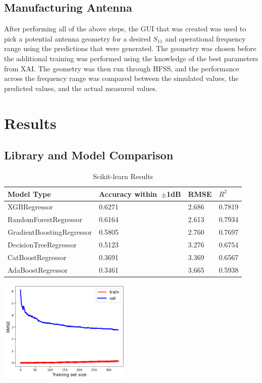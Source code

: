 \documentclass[conference]{IEEEtran}
\newenvironment{Figure}
    {\par\medskip\noindent\minipage{\linewidth}}
    {\endminipage\par\medskip}
\begin{document}
\subsection{Manufacturing Antenna}
After performing all of the above steps, the GUI that was created was used to pick a potential antenna geometry for a desired $S_{11}$ and operational frequency range using the predictions that were generated. The geometry was chosen before the additional training was performed using the knowledge of the best parameters from XAI. The geometry was then run through HFSS, and the performance across the frequency range was compared between the simulated values, the predicted values, and the actual measured values. 


\section{Results}
\subsection{Library and Model Comparison}

\begin{table}[h]
\caption{Scikit-learn Results}
\begin{center}
\begin{tabular}{ |l|l|l|l| }
    \hline
    Model Type & Accuracy within~$\pm$1dB & RMSE & $R^2$ \\ 
    \hline
    XGBRegressor & 0.6271 & 2.686 & 0.7819 \\  
    \hline
    RandomForestRegressor & 0.6164 & 2.613 & 0.7934 \\
    \hline  
    GradientBoostingRegressor & 0.5805 & 2.760 & 0.7697 \\
    \hline
    DecisionTreeRegressor & 0.5123 & 3.276 & 0.6754 \\  
    \hline
    CatBoostRegressor & 0.3691 & 3.369 & 0.6567 \\    
    \hline
    AdaBoostRegressor & 0.3461 & 3.665 & 0.5938 \\  
    \hline
\end{tabular}
\end{center}
\label{comparing_sklearn}
\end{table}

\begin{Figure}
    \centering
    \includegraphics[width=2.5in]{images/learningcurve1.png}
    \label{learning_curve}
\end{Figure}
\end{document}
